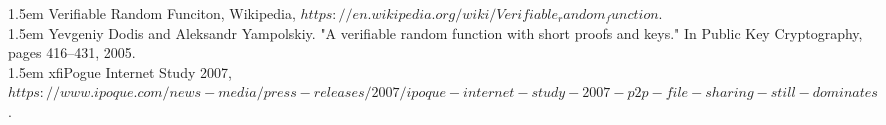 \documentclass[10pt,a4paper]{article}
\begin{document}
\begin{thebibliography}{99}
\hangindent 1.5em
\noindent  
{} Verifiable Random Funciton, Wikipedia, $https://en.wikipedia.org/wiki/Verifiable_random_function$.
  \vspace{-1em}
\\

\hangindent 1.5em
\noindent  
{}Yevgeniy Dodis and Aleksandr Yampolskiy. "A verifiable random function with short proofs and keys." In Public Key Cryptography, pages 416–431, 2005.
  \vspace{-1em}
\\

\hangindent 1.5em
\noindent  
{}xfiPogue Internet Study 2007,$ https://www.ipoque.com/news-media/press-releases/2007/ipoque-internet-study-2007-p2p-file-sharing-still-dominates$.

\end{thebibliography}

   
\end{document}

